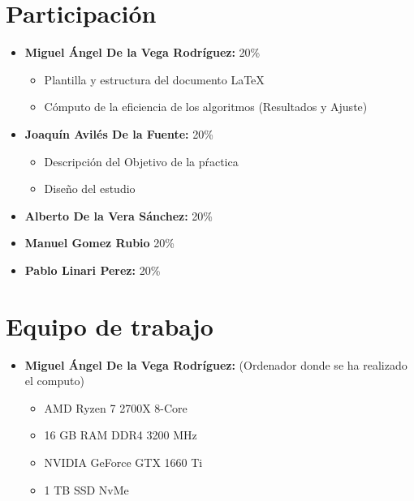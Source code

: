 \documentclass[11pt]{article}
\begin{document}
                                                

\tableofcontents %

\newpage %

\section{Participación}
\begin{itemize}
    \item \textbf{Miguel Ángel De la Vega Rodríguez:} 20\%
    \begin{itemize}
        \item Plantilla y estructura del documento \LaTeX
        \item Cómputo de la eficiencia de los algoritmos (Resultados y Ajuste)
    \end{itemize}
    \item \textbf{Joaquín Avilés De la Fuente:} 20\%
    \begin{itemize}
        \item Descripción del Objetivo de la pŕactica
        \item Diseño del estudio
    \end{itemize}
    \item \textbf{Alberto De la Vera Sánchez: } 20\%
    \item \textbf{Manuel Gomez Rubio} 20\%
    \item \textbf{Pablo Linari Perez:} 20\%
\end{itemize}

\section{Equipo de trabajo}

\begin{itemize}
    \item \textbf{Miguel Ángel De la Vega Rodríguez:} (Ordenador donde se ha realizado el computo)
        \begin{itemize}
            \item AMD Ryzen 7 2700X 8-Core
            \item 16 GB RAM DDR4 3200 MHz
            \item NVIDIA GeForce GTX 1660 Ti 
            \item 1 TB SSD NvMe 
        \end{itemize}
\end{itemize}
\end{document}
